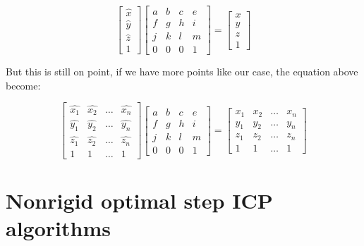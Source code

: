 \documentclass[../structure.tex]{subfiles}
\begin{document}
\begin{equation*}
\begin{bmatrix}
\hat{x} \\ \hat{y} \\ \hat{z} \\ 1
\end{bmatrix}
\begin{bmatrix}
a & b & c & e\\
f & g & h & i\\
j & k & l & m\\
0 & 0 & 0 & 1
\end{bmatrix}
= 
\begin{bmatrix}
x \\ y \\ z \\ 1
\end{bmatrix}
\end{equation*}

But this is still on point, if we have more points like our case, the equation above become:

\begin{equation*}
\begin{bmatrix}
\hat{x_{1}} & \hat{x_{2}} & \dots & \hat{x_{n}}\\
\hat{y_{1}} & \hat{y_{2}} & \dots & \hat{y_{n}}\\
\hat{z_{1}} & \hat{z_{2}} & \dots & \hat{z_{n}}\\
1 & 1 & \dots & 1
\end{bmatrix}
\begin{bmatrix}
a & b & c & e\\
f & g & h & i\\
j & k & l & m\\
0 & 0 & 0 & 1
\end{bmatrix}
= 
\begin{bmatrix}
x_{1} & x_{2} & \dots & x_{n}\\
y_{1} & y_{2} & \dots & y_{n}\\
z_{1} & z_{2} & \dots & z_{n}\\
1 & 1 & \dots & 1
\end{bmatrix}
\end{equation*}

\section{Nonrigid optimal step ICP algorithms}
\end{document}
